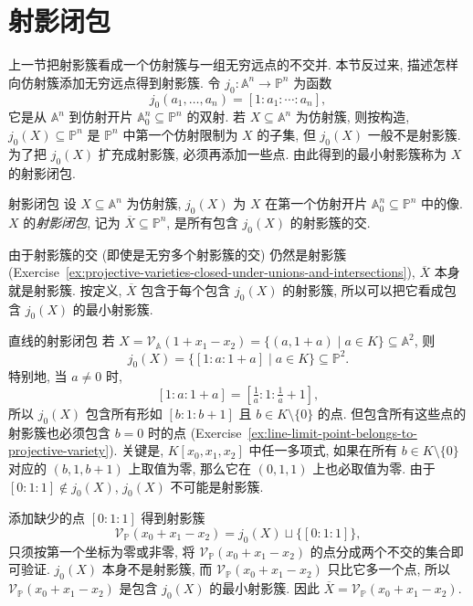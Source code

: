 \section{射影闭包}\label{sec:projective-closures}

上一节把射影簇看成一个仿射簇与一组无穷远点的不交并. 本节反过来, 描述怎样向仿射簇添加无穷远点得到射影簇. 令 $j_{0}:\mathbb{A}^{n}\to\mathbb{P}^{n}$ 为函数
\[
  j_{0}(a_{1},\ldots,a_{n})=[1:a_{1}:\cdots:a_{n}],
\]
它是从 $\mathbb{A}^{n}$ 到仿射开片 $\mathbb{A}_{0}^{n}\subseteq\mathbb{P}^{n}$ 的双射. 若 $X\subseteq\mathbb{A}^{n}$ 为仿射簇, 则按构造, $j_{0}(X)\subseteq\mathbb{P}^{n}$ 是 $\mathbb{P}^{n}$ 中第一个仿射限制为 $X$ 的子集, 但 $j_{0}(X)$ 一般不是射影簇. 为了把 $j_{0}(X)$ 扩充成射影簇, 必须再添加一些点. 由此得到的最小射影簇称为 $X$ 的射影闭包.

\begin{Definition}{射影闭包}\leavevmode\label{def:projective-closure}
设 $X\subseteq\mathbb{A}^{n}$ 为仿射簇, $j_{0}(X)$ 为 $X$ 在第一个仿射开片 $\mathbb{A}_{0}^{n}\subseteq\mathbb{P}^{n}$ 中的像. $X$ 的\emph{射影闭包}, 记为 $\overline{X}\subseteq\mathbb{P}^{n}$, 是所有包含 $j_{0}(X)$ 的射影簇的交.
\end{Definition}

由于射影簇的交 (即使是无穷多个射影簇的交) 仍然是射影簇 (Exercise~\ref{ex:projective-varieties-closed-under-unions-and-intersections}), $\overline{X}$ 本身就是射影簇. 按定义, $\overline{X}$ 包含于每个包含 $j_{0}(X)$ 的射影簇, 所以可以把它看成包含 $j_{0}(X)$ 的最小射影簇.

\begin{Example}{直线的射影闭包}\leavevmode\label{ex:projective-closure-of-affine-line}
若 $X=\mathcal{V}_{\mathbb{A}}(1+x_{1}-x_{2})=\{(a,1+a)\mid a\in K\}\subseteq\mathbb{A}^{2}$, 则
\[
  j_{0}(X)=\{[1:a:1+a]\mid a\in K\}\subseteq\mathbb{P}^{2}.
\]
特别地, 当 $a\neq0$ 时,
\[
  [1:a:1+a]=[\tfrac{1}{a}:1:\tfrac{1}{a}+1],
\]
所以 $j_{0}(X)$ 包含所有形如 $[b:1:b+1]$ 且 $b\in K\setminus\{0\}$ 的点. 但包含所有这些点的射影簇也必须包含 $b=0$ 时的点 (Exercise~\ref{ex:line-limit-point-belongs-to-projective-variety}). 关键是, $K[x_{0},x_{1},x_{2}]$ 中任一多项式, 如果在所有 $b\in K\setminus\{0\}$ 对应的 $(b,1,b+1)$ 上取值为零, 那么它在 $(0,1,1)$ 上也必取值为零. 由于 $[0:1:1]\notin j_{0}(X)$, $j_{0}(X)$ 不可能是射影簇.

添加缺少的点 $[0:1:1]$ 得到射影簇
\[
  \mathcal{V}_{\mathbb{P}}(x_{0}+x_{1}-x_{2})=j_{0}(X)\sqcup\{[0:1:1]\},
\]
只须按第一个坐标为零或非零, 将 $\mathcal{V}_{\mathbb{P}}(x_{0}+x_{1}-x_{2})$ 的点分成两个不交的集合即可验证. $j_{0}(X)$ 本身不是射影簇, 而 $\mathcal{V}_{\mathbb{P}}(x_{0}+x_{1}-x_{2})$ 只比它多一个点, 所以 $\mathcal{V}_{\mathbb{P}}(x_{0}+x_{1}-x_{2})$ 是包含 $j_{0}(X)$ 的最小射影簇. 因此 $\overline{X}=\mathcal{V}_{\mathbb{P}}(x_{0}+x_{1}-x_{2})$.
\end{Example}


